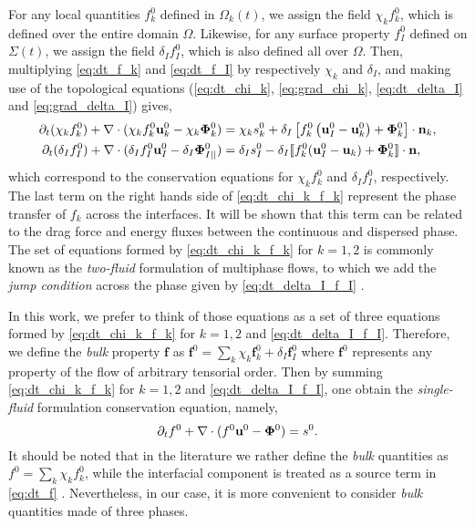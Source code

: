 For any local quantities $f_k^0$ defined in $\Omega_k(t)$, we assign the field $\chi_k f_k^0$, which is defined over the entire domain $\Omega$. 
Likewise, for any surface property $f_I^0$ defined on $\Sigma(t)$, we assign the field $\delta_I f_I^0$, which is also defined all over $\Omega$. 
Then, multiplying \ref{eq:dt_f_k} and \ref{eq:dt_f_I} by respectively $\chi_k$ and $\delta_I$, and making use of the topological equations (\ref{eq:dt_chi_k}, \ref{eq:grad_chi_k}, \ref{eq:dt_delta_I} and \ref{eq:grad_delta_I}) gives, 
\begin{align}
    \partial_t (\chi_k f_k^0)
    + \mathbf{\nabla}\cdot (
        \chi_k f_k^0 \textbf{u}_k^0
        - \chi_k \mathbf{\Phi}_k^0 
        )
    &= 
    \chi_k s_k^0
    + \delta_I\left[
        f_k^0
        \left(
            \textbf{u}_I^0
            - \textbf{u}_k^0
        \right)
        + \mathbf{\Phi}_k^0
    \right]
    \cdot \textbf{n}_k ,
    \label{eq:dt_chi_k_f_k}\\
    \partial_t (\delta_If_I^0)  
    + \mathbf{\nabla}\cdot (
        \delta_I f_I^0 \textbf{u}_I^0
        - \delta_I \mathbf{\Phi}_{I||}^0 
        )
    &= 
    \delta_Is_I^0
    - \delta_I \llbracket 
    f_k^0 (\textbf{u}_I^0 - \textbf{u}_k)
    + \mathbf{\Phi}_k^0
     \rrbracket \cdot \textbf{n},
    \label{eq:dt_delta_I_f_I}
\end{align}
which correspond to the conservation equations for $\chi_kf_k^0$ and $\delta_If_I^0$, respectively.
The last term on the right hands side of \ref{eq:dt_chi_k_f_k} represent the phase transfer of $f_k$ across the interfaces.
It will be shown that this term can be related to the drag force and energy fluxes between the continuous and dispersed phase. 
The set of equations formed by \ref{eq:dt_chi_k_f_k} for $k =1,2$ is commonly known as the \textit{two-fluid} formulation of multiphase flows, to which we add the \textit{jump condition} across the phase given by \ref{eq:dt_delta_I_f_I} \citep{morel2015mathematical,tryggvason2011direct,drew1983mathematical,kataoka1986local}. 

In this work, we prefer to think of those equations as a set of three equations formed by \ref{eq:dt_chi_k_f_k} for $k=1,2$ and \ref{eq:dt_delta_I_f_I}. 
Therefore, we define the \textit{bulk} property $\textbf{f}$ as $\textbf{f}^0 = \sum_k \chi_k \textbf{f}_k^0 + \delta_I \textbf{f}_I^0$ where $\textbf{f}^0$ represents any property of the flow of arbitrary tensorial order.
Then by summing \ref{eq:dt_chi_k_f_k} for $k=1,2$ and \ref{eq:dt_delta_I_f_I}, one obtain the \textit{single-fluid} formulation conservation equation, namely,
\begin{equation}
    \partial_t f^0
    + \mathbf{\nabla}\cdot (
        f^0 \textbf{u}^0
        -  \mathbf{\Phi}^0 
     )
    = s^0. 
    \label{eq:dt_f}
\end{equation}
It should be noted that in the literature we rather define the \textit{bulk} quantities as $f^0 = \sum_k \chi_k f_k^0$, while the interfacial component is treated as a source term in \ref{eq:dt_f} \citep{morel2015mathematical,tryggvason2011direct,drew1983mathematical}. 
Nevertheless, in our case, it is more convenient to consider \textit{bulk} quantities made of three phases. 



